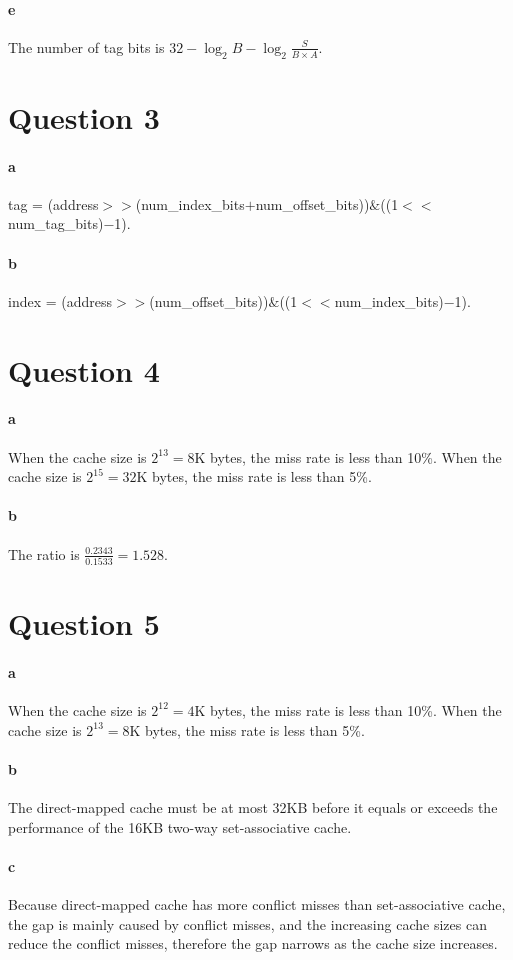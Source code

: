 \documentclass[12pt,letterpaper]{article}
\begin{document}
\paragraph*{e}
The number of tag bits is $32-\log_2B-\log_2\frac{S}{B\times A}$.
\section*{Question 3}
\paragraph*{a}
tag = 
(address$>>$(num\_index\_bits$+$num\_offset\_bits))$\&$((1$<<$num\_tag\_bits)$-$1).
\paragraph*{b}
index =
(address$>>$(num\_offset\_bits))$\&$((1$<<$num\_index\_bits)$-$1).
\section*{Question 4}
\paragraph*{a}
When the cache size is $2^{13}=8$K bytes, the miss rate is less than 10\%. When the cache
size is $2^{15}=32$K bytes, the miss rate is less than 5\%.
\paragraph*{b}
The ratio is $\frac{0.2343}{0.1533}=1.528$.
\section*{Question 5}
\paragraph*{a}
When the cache size is $2^{12}=4$K bytes, the miss rate is less than 10\%. When the cache 
size is $2^{13}=8$K bytes, the miss rate is less than 5\%.
\paragraph*{b}
The direct-mapped cache must be at most 32KB before it equals or exceeds the performance 
of the 16KB two-way set-associative cache.
\paragraph*{c}
Because direct-mapped cache has more conflict misses than set-associative cache, the
gap is mainly caused by conflict misses, and the increasing cache sizes can reduce the
conflict misses, therefore the gap narrows as the cache size increases.
\end{document}
